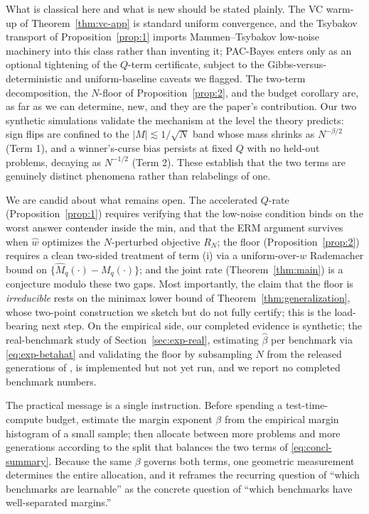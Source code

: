 \documentclass{article} %
\providecommand{\Risk}{R}
\providecommand{\Mhat}{\widehat{M}}
\providecommand{\what}{\widehat{w}}
\begin{document}
What is classical here and what is new should be stated plainly. The VC warm-up
of Theorem~\ref{thm:vc-app} is standard uniform convergence, and the Tsybakov
transport of Proposition~\ref{prop:1} imports Mammen--Tsybakov low-noise machinery
into this class rather than inventing it; PAC-Bayes enters only as an optional
tightening of the $Q$-term certificate, subject to the Gibbs-versus-deterministic
and uniform-baseline caveats we flagged. The two-term decomposition, the
$N$-floor of Proposition~\ref{prop:2}, and the budget corollary are, as far as we
can determine, new, and they are the paper's contribution. Our two synthetic
simulations validate the mechanism at the level the theory predicts: sign flips are
confined to the $|M|\lesssim 1/\sqrt N$ band whose mass shrinks as $N^{-\beta/2}$
(Term 1), and a winner's-curse bias persists at fixed $Q$ with no held-out
problems, decaying as $N^{-1/2}$ (Term 2). These establish that the two terms
are genuinely distinct phenomena rather than relabelings of one.

We are candid about what remains open. The accelerated $Q$-rate
(Proposition~\ref{prop:1}) requires verifying that the low-noise condition binds on
the worst answer contender inside the min, and that the ERM argument survives when
$\what$ optimizes the $N$-perturbed objective $\Risk_N$; the floor
(Proposition~\ref{prop:2}) requires a clean two-sided treatment of term (i) via a
uniform-over-$w$ Rademacher bound on $\{\Mhat_q(\cdot)-M_q(\cdot)\}$; and the joint
rate (Theorem~\ref{thm:main}) is a conjecture modulo these two gaps. Most
importantly, the claim that the floor is \emph{irreducible} rests on the minimax
lower bound of Theorem~\ref{thm:generalization}, whose two-point construction we
sketch but do not fully certify; this is the load-bearing next step. On the
empirical side, our completed evidence is synthetic; the real-benchmark study of
Section~\ref{sec:exp-real}, estimating $\hat\beta$ per benchmark via
\eqref{eq:exp-betahat} and validating the floor by subsampling $N$ from the released
generations of \citet{komiyama2026best}, is implemented but not yet run, and we
report no completed benchmark numbers.

The practical message is a single instruction. Before spending a test-time-compute
budget, estimate the margin exponent $\beta$ from the empirical margin histogram of a
small sample; then allocate between more problems and more generations according to
the split that balances the two terms of \eqref{eq:concl-summary}. Because the same
$\beta$ governs both terms, one geometric measurement determines the entire
allocation, and it reframes the recurring question of ``which benchmarks are
learnable'' as the concrete question of ``which benchmarks have well-separated
margins.''
\end{document}
